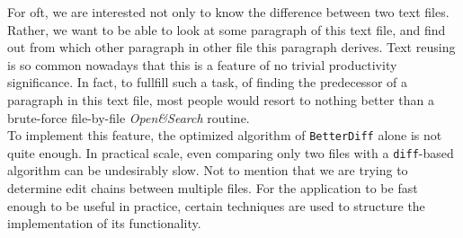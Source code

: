\documentclass{article}
\begin{document}
For oft, we are interested not only to know the difference between two text files. Rather, we want to be able to look at some paragraph of this text file, and find out from which other paragraph in other file this paragraph derives. Text reusing is so common nowadays that this is a feature of no trivial productivity significance. In fact, to fullfill such a task, of finding the predecessor of a paragraph in this text file, most people would resort to nothing better than a brute-force file-by-file \textit{Open\&Search} routine. \\

To implement this feature, the optimized algorithm of \texttt{BetterDiff} alone is not quite enough. In practical scale, even comparing only two files with a \texttt{diff}-based algorithm can be undesirably slow. Not to mention that we are trying to determine edit chains between multiple files. For the application to be fast enough to be useful in practice, certain techniques are used to structure the implementation of its functionality.\\
\end{document}
